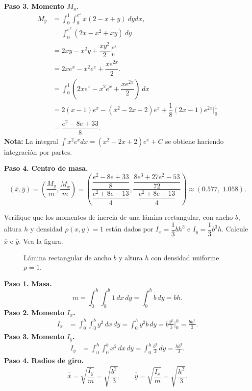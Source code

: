 \begin{prob}
\begin{myproof}
\textbf{Paso 3. Momento $M_y$.}
\begin{align*}
M_{y}&=\int_{0}^{1}\int_{0}^{e^x}x\left(2-x+y\right)\ dydx,\\
&=\int_{0}^{e^x}\left(2x-x^2+xy\right)\ dy  \\ &=2xy-x^2y+\dfrac{xy^2}{2}\Big|_{0}^{e^x}\\&=2xe^{x}-x^2e^{x}+\dfrac{xe^{2x}}{2}.\\
&=\int_{0}^{1} \left( 2xe^{x}-x^2e^{x}+\dfrac{xe^{2x}}{2} \right) \ dx  \\
&=2(x-1)e^{x}-(x^2-2x+2)e^x+ \dfrac{1}{8}\left( 2x-1 \right)e^{2x}\Big|_{0}^{1}\\
&=\dfrac{e^2-8e+33}{8}.
\end{align*}
\textbf{Nota:} La integral $\displaystyle\int x^2e^{x}dx=(x^2-2x+2)e^x+C$ se obtiene haciendo integración por partes.

\textbf{Paso 4. Centro de masa.}
\[
(\bar{x},\bar{y}) = \left(\frac{M_y}{m},\frac{M_x}{m}\right) = \left(\frac{\dfrac{e^2-8e+33}{8}}{\dfrac{e^2+8e-13}{4}},\frac{\dfrac{8e^3+27e^2-53}{72}}{\dfrac{e^2+8e-13}{4}}\right) \approx \boxed{(0.577,\;1.058)}.
\]
\end{myproof}
\end{prob}

\begin{prob}
Verifique que los momentos de inercia de una lámina rectangular, con ancho $b$, altura $h$ y densidad $\rho(x,y)=1$ están dados por $I_x=\dfrac{1}{3}bh^3$ e $I_y=\dfrac{1}{3}b^3h.$ Calcule $\overline{\overline{x}}$ e $\overline{\overline{y}}.$ Vea la figura.
\begin{figure}[!htbp]
\centering
{}
\caption{Lámina rectangular de ancho $b$ y altura $h$ con densidad uniforme $\rho=1$.}
\label{fig:lamina_rect_inercia}
\end{figure}
\begin{myproof}
\textbf{Paso 1. Masa.}
\[
m=\int_{0}^{h}\int_{0}^{b}1\,dx\,dy = \int_{0}^{h}b\,dy = bh.
\]
\textbf{Paso 2. Momento $I_x$.}
\begin{align*}
I_x&=\int_{0}^{h}\int_{0}^{b} y^2\,dx\,dy = \int_{0}^{h}y^2 b\,dy = b\frac{y^3}{3}\Big|_{0}^{h}=\frac{bh^3}{3}.
\end{align*}
\textbf{Paso 3. Momento $I_y$.}
\begin{align*}
I_y&=\int_{0}^{h}\int_{0}^{b} x^2\,dx\,dy = \int_{0}^{h}\frac{b^3}{3}\,dy = \frac{hb^3}{3}.
\end{align*}
\textbf{Paso 4. Radios de giro.}
\[
\overline{\overline{x}}=\sqrt{\frac{I_y}{m}}=\sqrt{\frac{b^2}{3}},\qquad
\overline{\overline{y}}=\sqrt{\frac{I_x}{m}}=\sqrt{\frac{h^2}{3}}.
\]
\end{myproof}
\end{prob}


